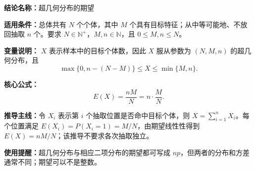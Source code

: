 \textbf{结论名称：}超几何分布的期望

\textbf{适用条件：}总体共有 $N$ 个个体，其中 $M$ 个具有目标特征；从中等可能地、不放回抽取 $n$ 个。要求 $N\in\mathbb{N}^{+}$，$M,n\in\mathbb{N}$，且 $0\le M,n\le N$。

\textbf{变量说明：}
$X$ 表示样本中的目标个体数，因此 $X$ 服从参数为 $(N,M,n)$ 的超几何分布，且
\[
\max\{0,n-(N-M)\}\le X\le\min\{M,n\}.
\]

\textbf{核心公式：}
\[
\boxed{E(X)=\frac{nM}{N}=n\cdot\frac{M}{N}}.
\]

\textbf{推导主线：}令 $X_i$ 表示第 $i$ 个抽取位置是否命中目标个体，则 $X=\sum_{i=1}^{n}X_i$。每个位置满足 $E(X_i)=P(X_i=1)=M/N$，由期望线性性得到 $E(X)=nM/N$；该推导不要求各次抽取独立。

\textbf{使用提醒：}超几何分布与相应二项分布的期望都可写成 $np$，但两者的分布和方差通常不同；期望可以不是整数。
